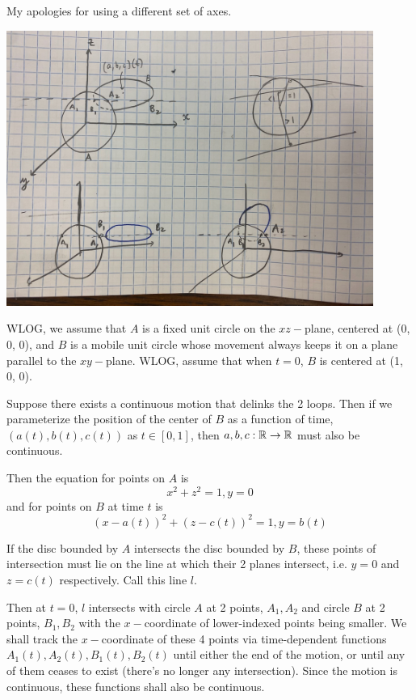 \documentclass[a4paper, 11pt]{article}
\begin{document}
\begin{solution}
    My apologies for using a different set of axes.

    \begin{center}
        \includegraphics[width=12cm]{figures/2.49.jpeg}
    \end{center}

    WLOG, we assume that $A$ is a fixed unit circle on the $xz-$plane, centered at (0, 0, 0), and $B$ is a mobile unit circle whose movement always keeps it on a plane parallel to the $xy-$plane. WLOG, assume that when $t = 0$, $B$ is centered at (1, 0, 0). 
    
    Suppose there exists a continuous motion that delinks the 2 loops. Then if we parameterize the position of the center of $B$ as a function of time, $(a(t), b(t), c(t))$ as $t \in [0, 1]$, then $a, b, c: \mathbb{R} \to \mathbb{R}$ must also be continuous.

    Then the equation for points on $A$ is \[
        x^2 + z^2 = 1, y = 0    
    \]
    and for points on $B$ at time $t$ is \[
        (x - a(t))^2 + (z - c(t)) ^2 = 1, y = b(t)
    \]

    If the disc bounded by $A$ intersects the disc bounded by $B$, these points of intersection must lie on the line at which their 2 planes intersect, i.e. $y = 0$ and $z = c(t)$ respectively. Call this line $l$.

    Then at $t = 0$, $l$ intersects with circle $A$ at 2 points, $A_1, A_2$ and circle $B$ at 2 points, $B_1, B_2$ with the $x-$coordinate of lower-indexed points being smaller. We shall track the $x-$coordinate of these 4 points via time-dependent functions $A_1(t), A_2(t), B_1(t), B_2(t)$ until either the end of the motion, or until any of them ceases to exist (there's no longer any intersection). Since the motion is continuous, these functions shall also be continuous.


\end{solution}
\end{document}
